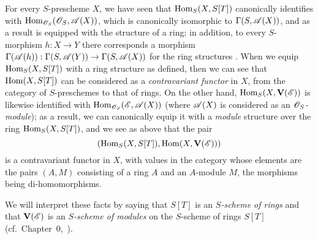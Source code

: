\begin{env}[1.7.13]
\label{II.1.7.13}
For every $S$-prescheme $X$, we have seen  that $\operatorname{Hom}_S(X,S[T])$ canonically identifies with $\operatorname{Hom}_{\mathscr{O}_S}(\mathscr{O}_S,\mathscr{A}(X))$, which is canonically isomorphic to $\Gamma(S,\mathscr{A}(X))$, and as a result is equipped with the structure of a ring; in addition, to every $S$-morphism $h:X\to Y$ there corresponds a morphism $\Gamma(\sh{A}(h)):\Gamma(S,\sh{A}(Y))\to\Gamma(S,\sh{A}(X))$ for the ring structures .
When we equip $\operatorname{Hom}_S(X,S[T])$ with a ring structure as defined, then we can see that $\operatorname{Hom}(X,S[T])$ can be considered as a \emph{contravariant functor} in $X$, from the category of $S$-preschemes to that of rings.
On the other hand, $\operatorname{Hom}_S(X,\mathbf{V}(\mathscr{E}))$ is likewise identified with $\operatorname{Hom}_{\mathscr{O}_S}(\mathscr{E},\mathscr{A}(X))$ (where $\mathscr{A}(X)$ is considered as an \emph{$\mathscr{O}_S$-module});
as a result, we can canonically equip it with a \emph{module} structure over the ring $\operatorname{Hom}_S(X,S[T])$, and we see as above that the pair
\[
  (\operatorname{Hom}_S(X,S[T]),\operatorname{Hom}(X,\mathbf{V}(\mathscr{E})))
\]
is a contravariant functor in $X$, with values in the category whose elements are the pairs $(A,M)$ consisting of a ring $A$ and an $A$-module $M$, the morphisms being di-homomorphisms.

We will interpret these facts by saying that $S[T]$ is an \emph{$S$-scheme of rings} and that $\mathbf{V}(\mathscr{E})$ is an \emph{$S$-scheme of modules} on the $S$-scheme of rings $S[T]$ (cf.~Chapter~0,~).
\end{env}

